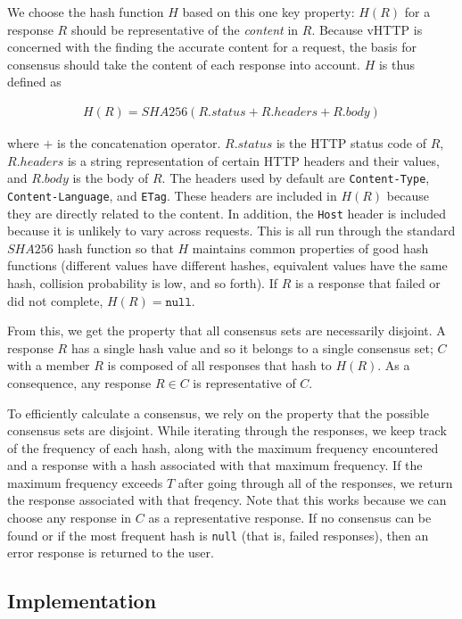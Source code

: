 We choose the hash function $H$ based on this one key property: $H(R)$ for a
response $R$ should be representative of the \emph{content} in $R$. Because
vHTTP is concerned with the finding the accurate content for a request, the
basis for consensus should take the content of each response into account.
$H$ is thus defined as

\begin{align*}
  H(R) = SHA256(R.status + R.headers + R.body)
\end{align*}

where $+$ is the concatenation operator. $R.status$ is the HTTP status code of
$R$, $R.headers$ is a string representation of certain HTTP headers and their
values, and $R.body$ is the body of $R$. The headers used by default are
\texttt{Content-Type}, \texttt{Content-Language}, and \texttt{ETag}. These
headers are included in $H(R)$ because they are directly related to the
content. In addition, the \texttt{Host} header is included because it is
unlikely to vary across requests. This is all run through the standard $SHA256$
hash function so that $H$ maintains common properties of good hash functions
(different values have different hashes, equivalent values have the same hash,
collision probability is low, and so forth). If $R$ is a response that failed
or did not complete, $H(R) = \texttt{null}$.

From this, we get the property that all consensus sets are necessarily
disjoint. A response $R$ has a single hash value and so it belongs to a single
consensus set; $C$ with a member $R$ is composed of all responses that hash to
$H(R)$. As a consequence, any response $R \in C$ is representative of $C$.

To efficiently calculate a consensus, we rely on the property that the possible
consensus sets are disjoint. While iterating through the responses, we
keep track of the frequency of each hash, along with the maximum frequency
encountered and a response with a hash associated with that maximum frequency.
If the maximum frequency exceeds $T$ after going through all of the responses,
we return the response associated with that freqency. Note that this works
because we can choose any response in $C$ as a representative response.
If no consensus can be found or if the most frequent hash is \texttt{null}
(that is, failed responses), then an error response is returned to the user.



\subsection{Implementation}

